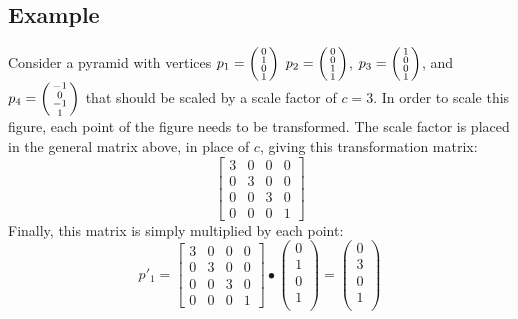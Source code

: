 \documentclass{article}
\begin{document}
	\subsection{Example}
	Consider a pyramid with vertices
	\(p_{1} = \begin{psmallmatrix} 0 \\ 1 \\ 0 \\ 1 \\ \end{psmallmatrix}\)
	\(p_{2} = \begin{psmallmatrix} 0 \\ 0 \\ 1 \\ 1 \\ \end{psmallmatrix}\),
	\(p_{3} = \begin{psmallmatrix} 1 \\ 0 \\ 0 \\ 1 \\ \end{psmallmatrix}\), and
	\(p_{4} = \begin{psmallmatrix} -1 \\ 0 \\ -1 \\ 1 \\ \end{psmallmatrix}\)
	that should be scaled by a scale factor of $c=3$.
	In order to scale this figure, each point of the figure needs to be transformed. The scale factor is placed in the general matrix above, in place of $c$, giving this transformation matrix:
	\[
		\begin{bmatrix}
			3 & 0 & 0 & 0 \\
			0 & 3 & 0 & 0 \\
			0 & 0 & 3 & 0 \\
			0 & 0 & 0 & 1
		\end{bmatrix}
	\]
	Finally, this matrix is simply multiplied by each point:
	\[
		p'_{1} =
		\begin{bmatrix}
			3 & 0 & 0 & 0 \\
			0 & 3 & 0 & 0 \\
			0 & 0 & 3 & 0 \\
			0 & 0 & 0 & 1
		\end{bmatrix}
		\bullet
		\begin{pmatrix}
			0 \\ 1 \\ 0 \\ 1 \\
		\end{pmatrix}
		=
		\begin{pmatrix}
			0 \\ 3 \\ 0 \\ 1 \\
		\end{pmatrix}
	\]
\end{document}

